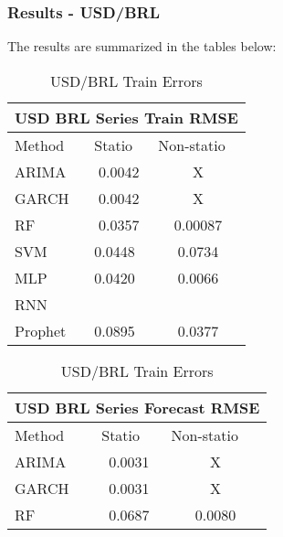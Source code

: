 \documentclass{beamer}
\begin{document}
\begin{frame}
\end{frame}


	\begin{frame}
	\frametitle{Results - USD/BRL}
	The results are summarized in the tables below:
	
	\begin{table}
		\parbox{.45\linewidth}{
			\centering
			\begin{tabular}{|lll|}
				\hline
				\multicolumn{3}{|c|}{USD BRL Series Train RMSE}                                                  \\ \hline
				\multicolumn{1}{|l|}{Method}  & \multicolumn{1}{l|}{Statio} & Non-statio             \\ \hline
				\multicolumn{1}{|l|}{ARIMA}   & \multicolumn{1}{c|}{0.0042}       & \multicolumn{1}{c|}{X} \\ \hline
				\multicolumn{1}{|l|}{GARCH}   & \multicolumn{1}{c|}{0.0042}       & \multicolumn{1}{c|}{X} \\ \hline
				\multicolumn{1}{|l|}{RF}      & \multicolumn{1}{c|}{0.0357}       & \multicolumn{1}{c|}{0.00087}  \\ \hline
				\multicolumn{1}{|l|}{SVM}     & \multicolumn{1}{l|}{0.0448}       & \multicolumn{1}{c|}{0.0734}  \\ \hline
				\multicolumn{1}{|l|}{MLP}     & \multicolumn{1}{l|}{0.0420}       & \multicolumn{1}{c|}{0.0066}  \\ \hline
				\multicolumn{1}{|l|}{RNN}     & \multicolumn{1}{l|}{}       & \multicolumn{1}{c|}{}  \\ \hline
				\multicolumn{1}{|l|}{Prophet} & \multicolumn{1}{l|}{0.0895}       & \multicolumn{1}{c|}{0.0377}  \\ \hline
			\end{tabular}
			\caption{USD/BRL Train Errors}
		}
		\hfill
		\parbox{.45\linewidth}{
			\centering
			\begin{tabular}{|lll|}
				\hline
				\multicolumn{3}{|c|}{USD BRL Series Forecast RMSE}                                                  \\ \hline
				\multicolumn{1}{|l|}{Method}  & \multicolumn{1}{l|}{Statio} & Non-statio             \\ \hline
				\multicolumn{1}{|l|}{ARIMA}   & \multicolumn{1}{c|}{0.0031}       & \multicolumn{1}{c|}{X} \\ \hline
				\multicolumn{1}{|l|}{GARCH}   & \multicolumn{1}{c|}{0.0031}       & \multicolumn{1}{c|}{X} \\ \hline
				\multicolumn{1}{|l|}{RF}      & \multicolumn{1}{c|}{0.0687}       & \multicolumn{1}{c|}{0.0080}  \\ \hline

\end{tabular}}
\end{table}
\end{frame}
\end{document}
